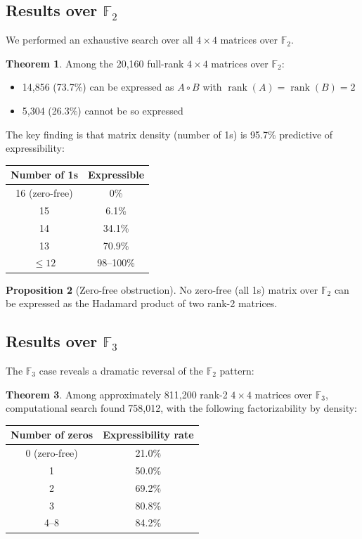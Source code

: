 \documentclass{article}
\theoremstyle{definition}
\newtheorem{theorem}{Theorem}
\newtheorem{proposition}[theorem]{Proposition}
\DeclareMathOperator{\rank}{rank}
\begin{document}
\subsection{Results over $\mathbb{F}_2$}

We performed an exhaustive search over all $4 \times 4$ matrices over $\mathbb{F}_2$.

\begin{theorem}
Among the 20,160 full-rank $4 \times 4$ matrices over $\mathbb{F}_2$:
\begin{itemize}
\item 14,856 (73.7\%) can be expressed as $A \circ B$ with $\rank(A) = \rank(B) = 2$
\item 5,304 (26.3\%) cannot be so expressed
\end{itemize}
\end{theorem}

The key finding is that matrix density (number of 1s) is 95.7\% predictive of expressibility:

\begin{center}
\begin{tabular}{cc}
\toprule
Number of 1s & Expressible \\
\midrule
16 (zero-free) & 0\% \\
15 & 6.1\% \\
14 & 34.1\% \\
13 & 70.9\% \\
$\leq 12$ & 98--100\% \\
\bottomrule
\end{tabular}
\end{center}

\begin{proposition}[Zero-free obstruction]
No zero-free (all 1s) matrix over $\mathbb{F}_2$ can be expressed as the Hadamard product of two rank-2 matrices.
\end{proposition}

\subsection{Results over $\mathbb{F}_3$}

The $\mathbb{F}_3$ case reveals a dramatic reversal of the $\mathbb{F}_2$ pattern:

\begin{theorem}
Among approximately 811,200 rank-2 $4 \times 4$ matrices over $\mathbb{F}_3$, computational search found 758,012, with the following factorizability by density:

\begin{center}
\begin{tabular}{cc}
\toprule
Number of zeros & Expressibility rate \\
\midrule
0 (zero-free) & 21.0\% \\
1 & 50.0\% \\
2 & 69.2\% \\
3 & 80.8\% \\
4--8 & 84.2\% \\
\bottomrule
\end{tabular}
\end{center}
\end{theorem}
\end{document}
